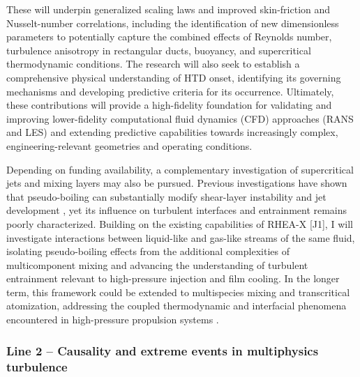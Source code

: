\documentclass[11pt]{article}
\begin{document}
These will underpin generalized scaling laws and improved skin-friction and Nusselt-number correlations, including the identification of new dimensionless parameters to potentially capture the combined effects of Reynolds number, turbulence anisotropy in rectangular ducts, buoyancy, and supercritical thermodynamic conditions.
The research will also seek to establish a comprehensive physical understanding of HTD onset, identifying its governing mechanisms and developing predictive criteria for its occurrence.
Ultimately, these contributions will provide a high-fidelity foundation for validating and improving lower-fidelity computational fluid dynamics (CFD) approaches (RANS and LES) and extending predictive capabilities towards increasingly complex, engineering-relevant geometries and operating conditions.

Depending on funding availability, a complementary investigation of supercritical jets and mixing layers may also be pursued.
Previous investigations have shown that pseudo-boiling can substantially modify shear-layer instability and jet development \cite{Lapenna2019,SharanBellan2021}, yet its influence on turbulent interfaces and entrainment remains poorly characterized.
Building on the existing capabilities of RHEA-X [J1], I will investigate interactions between liquid-like and gas-like streams of the same fluid, isolating pseudo-boiling effects from the additional complexities of multicomponent mixing and advancing the understanding of turbulent entrainment relevant to high-pressure injection and film cooling.
In the longer term, this framework could be extended to multispecies mixing and transcritical atomization, addressing the coupled thermodynamic and interfacial phenomena encountered in high-pressure propulsion systems \cite{JofreUrzay2021}.

\subsubsection{Line 2 -- Causality and extreme events in multiphysics turbulence}
\end{document}
